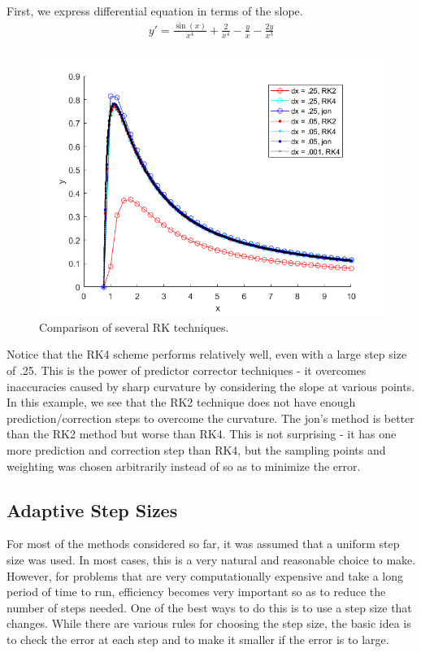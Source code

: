 \documentclass[]{article}
\theoremstyle{definition}
\numberwithin{equation}{section}
\begin{document}
	First, we express differential equation in terms of the slope.
	\begin{gather*}
		y' = \frac{\sin(x)}{x^4} + \frac{2}{x^4} - \frac{y}{x} - \frac{2y}{x^3} \\
	\end{gather*}
	
		\begin{center}
		\begin{figure}[H]
			\includegraphics[scale=.75]{ex5_fig.png} 
			\caption{Comparison of several RK techniques.}
			\label{fig:RK2RK4RKjon}
		\end{figure}
	\end{center}
Notice that the RK4 scheme performs relatively well, even with a large step size of .25. This is the power of predictor corrector techniques - it overcomes inaccuracies caused by sharp curvature by considering the slope at various points. In this example, we see that the RK2 technique does not have enough prediction/correction steps to overcome the curvature. The jon's method is better than the RK2 method but worse than RK4. This is not surprising - it has one more prediction and correction step than RK4, but the sampling points and weighting was chosen arbitrarily instead of so as to minimize the error.
	\subsection{Adaptive Step Sizes}
	For most of the methods considered so far, it was assumed that a uniform step size was used. In most cases, this is a very natural and reasonable choice to make. However, for problems that are very computationally expensive and take a long period of time to run, efficiency becomes very important so as to reduce the number of steps needed. One of the best ways to do this is to use a step size that changes. While there are various rules for choosing the step size, the basic idea is to check the error at each step and to make it smaller if the error is to large.
\end{document}
